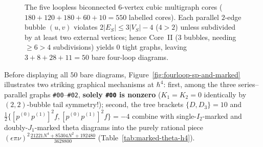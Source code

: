 \documentclass[11pt,letterpaper]{article}
\numberwithin{equation}{section}
\theoremstyle{plain}
\theoremstyle{definition}
\theoremstyle{remark}
\newcommand{\Aut}{\operatorname{Aut}}
\begin{document}
\begin{figure}[H]
\caption{The five loopless biconnected $6$-vertex cubic multigraph cores ($180+120+180+60+10 = 550$ labelled cores). Each parallel $2$-edge bubble $(u,v)$ violates $2|E_S|\le 3|V_S|-4$ ($4 > 2$) unless subdivided by at least two external vertices; hence Core~II ($3$ bubbles, needing $\ge 6 > 4$ subdivisions) yields $0$ tight graphs, leaving $3+8+28+11 = 50$ bare four-loop diagrams.}
\label{fig:five-sixvertex-cores}
\end{figure}

Before displaying all $50$ bare diagrams, Figure~\ref{fig:fourloop-sp-and-marked} illustrates two striking graphical mechanisms at $\hbar^4$: first, among the three series--parallel graphs \texttt{\#00}--\texttt{\#02}, \textbf{solely \texttt{\#00} is nonzero} ($K_1 = K_2 = 0$ identically by $(2,2)$-bubble tail symmetry!); second, the tree brackets $\{D, D_3\} = 10$ and $\frac{1}{2}\{[p^{(0)}p^{(1)}]^2 f, [p^{(0)}p^{(1)}]^2 f\} = -4$ combine with single-$I_2$-marked and doubly-$J_1$-marked theta diagrams into the purely rational piece $(\epsilon\pi\nu)^2\frac{21221N^4 + 85304N^2 + 192480}{3628800}$ (Table~\ref{tab:marked-theta-h4}).
\end{document}
